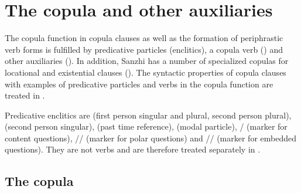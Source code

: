 \chapter{The copula and other auxiliaries}
\label{cpt:copulaotherauxiliaries}

The copula function in copula clauses as well as the formation of periphrastic verb forms is fulfilled by predicative particles (enclitics), a copula verb () and other auxiliaries (). In addition, Sanzhi has a number of specialized copulas for locational and existential clauses (). The syntactic properties of copula clauses with examples of predicative particles and verbs in the copula function are treated in .

Predicative enclitics are  (first person singular and plural, second person plural),  (second person singular),  (past time reference),  (modal particle), \slash{} (marker for content questions), \slash{}\slash{} (marker for polar questions) and \slash{}\slash{} (marker for embedded questions). They are not verbs and are therefore treated separately in .



\section{The copula}
\label{sec:The copula}

